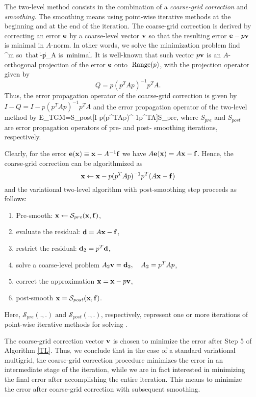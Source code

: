 The two-level method consists in the combination of
a {\em coarse-grid correction} and
{\em smoothing}. The smoothing means using point-wise iterative methods 
at the beginning and at the end of the iteration.
The coarse-grid correction is derived by correcting an error
${\bf e}$ by a coarse-level vector ${\bf v}$ so that the resulting error
${\bf e}-p{\bf v}$ is minimal in $A$-norm. In other words, we solve
the minimization problem
  \mbox{find} \;  \in \Re^m \; \mbox{so that} \;
  \| -p\|_A \; \mbox{is minimal}.
\qe
It is well-known that such vector $p{\bf v}$ is an $A$-orthogonal projection
of the error ${\bf e}$ onto ${\;\mathop {\rm Range}\nolimits}(p)$, with the projection
operator given by
$$
      Q = p(p^TAp)^{-1}p^TA.
$$
Thus, the error propagation operator of the coarse-grid correction is given by
$I-Q=I-p(p^TAp)^{-1}p^TA$ and the error propagation operator of the two-level
method by
      E_{TGM}=S_{post}[I-p(p^TAp)^{-1}p^TA]S_{pre},
\qe
where $S_{pre}$ and $S_{post}$ are error propagation operators of
pre- and post- smoothing iterations, respectively.

Clearly, for the error ${\bf e}({\bf x})\equiv {\bf x}-A^{-1}{\bf f}$ we have
$A{\bf e}({\bf x})=A{\bf x}-{\bf f}$. Hence, the coarse-grid correction can be
algorithmized  as
$$
     {\bf x} \leftarrow {\bf x} - p(p^TAp)^{-1}p^T(A{\bf x}-{\bf f})
$$
and the variational two-level algorithm with post-smoothing step
proceeds as follows:
\begin{algorithm}
\label{TL}
\quad
\begin{enumerate}
\item Pre-smooth: ${\bf x} \leftarrow {\mathcal S}_{pre}({\bf x},{\bf f})$,
\item evaluate the residual:
   ${\bf d}=A{\bf x}-{\bf f}$,
\item restrict the residual:
   ${\bf d}_2 = p^T{\bf d}$,
\item solve a coarse-level problem
   $A_2 {\bf v} = {\bf d}_2,\quad A_2 = p^TAp$,
\item correct the approximation
   ${\bf x} = {\bf x} - p{\bf v}$,
\item post-smooth
   ${\bf x} = {\mathcal S}_{post}({\bf x},{\bf f})$.
\end{enumerate}
\end{algorithm}
Here, ${\mathcal S}_{pre}(.,.)$ and ${\mathcal S}_{post}(.,.)$, respectively,
represent one or more iterations of
point-wise iterative methods for solving .


The coarse-grid correction vector ${\bf v}$ is chosen to minimize the error
after Step 5 of Algorithm \ref{TL}.
Thus, we conclude that in the case of a standard variational multigrid,
the coarse-grid correction procedure minimizes
the error in an intermediate stage of the iteration,
while we are in fact interested in minimizing the final
error after accomplishing the entire iteration. This means to minimize
the error after coarse-grid correction with subsequent smoothing.



